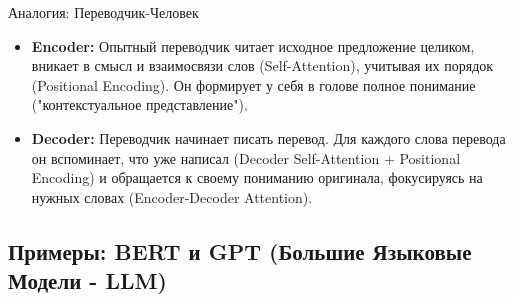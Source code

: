 \begin{myexampleblock}{Аналогия: Переводчик-Человек}
    \begin{itemize}
        \item \textbf{Encoder:} Опытный переводчик читает исходное предложение целиком, вникает в смысл и взаимосвязи слов (Self-Attention), учитывая их порядок (Positional Encoding). Он формирует у себя в голове полное понимание ("контекстуальное представление").
        \item \textbf{Decoder:} Переводчик начинает писать перевод. Для каждого слова перевода он вспоминает, что уже написал (Decoder Self-Attention + Positional Encoding) и обращается к своему пониманию оригинала, фокусируясь на нужных словах (Encoder-Decoder Attention).
    \end{itemize}
\end{myexampleblock}

\subsection{Примеры: BERT и GPT (Большие Языковые Модели - LLM)}

